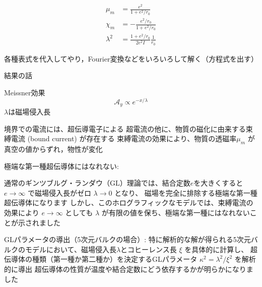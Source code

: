 \documentclass[b5paper,11pt,dvipdfmx]{jsarticle}
\numberwithin{equation}{section}
\theoremstyle{definition}
\begin{document}
\begin{equation}
    \begin{split}
            \mu_m
            &= \frac{e^2}{1 + e^2 / r_0}\\
            \chi_m
            &= - \frac{e^2 / r_0}{1 + e^2 / r_0}\\
            \lambda^2
            &= \frac{1 + e^2 / r_0}{2 e^2 I}\frac{1}{r_0}
    \end{split}
\end{equation}


















各種表式を代入してやり，Fourier変換などをいろいろして解く（方程式を出す）



結果の話

Meissner効果
\begin{equation}
    \mathcal{A}_{y}\propto e^{-x/\lambda}
\end{equation}
$\lambda$は磁場侵入長

境界での電流には、超伝導電子による
超電流の他に、物質の磁化に由来する束縛電流 (bound current) が存在する
束縛電流の効果により、物質の透磁率$\mu_m$ が真空の値からずれ，物性が変化

極端な第一種超伝導体にはなれない:

通常のギンツブルグ・ランダウ（GL）理論では、結合定数$e$を大きくすると
$e\rightarrow\infty$ で磁場侵入長がゼロ $\lambda \to 0$ となり、
磁場を完全に排除する極端な第一種超伝導体になります
しかし、このホログラフィックなモデルでは、束縛電流の効果により
$e\rightarrow\infty$ としても $\lambda$ が有限の値を保ち、極端な第一種にはなれないことが示されました

GLパラメータの導出（5次元バルクの場合）:
特に解析的な解が得られる5次元バルクのモデルにおいて、磁場侵入長$\lambda$とコヒーレンス長 $\xi$ を具体的に計算し、
超伝導体の種類（第一種か第二種か）を決定するGLパラメータ $\kappa^2 = \lambda^2 / \xi^2$ を解析的に導出
超伝導体の性質が温度や結合定数にどう依存するかが明らかになりました




\end{document}
